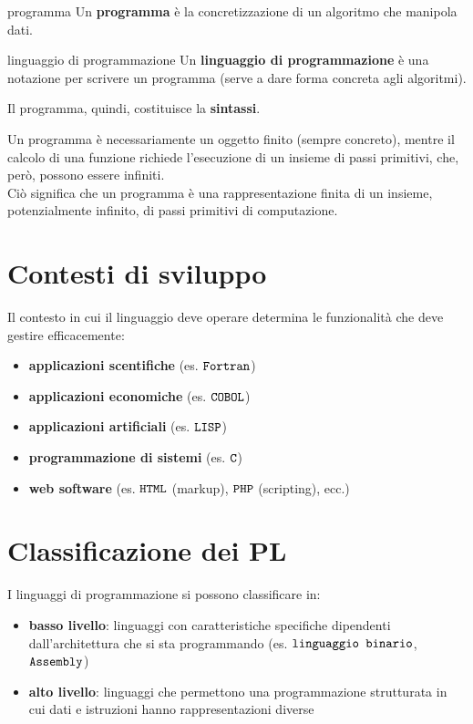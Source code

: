 \begin{mydef}{programma}
    Un \textbf{programma} è la concretizzazione di un algoritmo che manipola dati.
\end{mydef}

\begin{mydef}{linguaggio di programmazione}
    Un \textbf{linguaggio di programmazione} è una notazione per scrivere un programma (serve a dare forma concreta agli algoritmi).
\end{mydef}

Il programma, quindi, costituisce la \textcolor{colore}{\textbf{sintassi}}.

\smallskip
Un programma è necessariamente un oggetto finito (sempre concreto), mentre il calcolo di una funzione richiede l'esecuzione di un insieme di passi primitivi, che, però, possono essere infiniti.\\[0.2ex]
Ciò significa che un programma è una rappresentazione finita di un insieme, potenzialmente infinito, di passi primitivi di computazione.


\section{Contesti di sviluppo}
Il contesto in cui il linguaggio deve operare determina le funzionalità che deve gestire efficacemente:
\begin{itemize}[label=$\triangleright$, itemsep=\smallskipamount]
    \item \textbf{applicazioni scentifiche} (es. $\verb|Fortran|$)
    \item \textbf{applicazioni economiche} (es. $\verb|COBOL|$)
    \item \textbf{applicazioni artificiali} (es. $\verb|LISP|$)
    \item \textbf{programmazione di sistemi} (es. $\verb|C|$)
    \item \textbf{web software} (es. $\verb|HTML|$ (markup), $\verb|PHP|$ (scripting), ecc.)
\end{itemize}

\section{Classificazione dei PL}
I linguaggi di programmazione si possono classificare in:
\begin{itemize}[label=$\diamond$, itemsep=\smallskipamount]
    \item \textcolor{colore}{\textbf{basso livello}}: linguaggi con caratteristiche specifiche dipendenti dall'architettura che si sta programmando (es. $\verb|linguaggio binario|$, $\verb|Assembly|$)
    \item \textcolor{colore}{\textbf{alto livello}}: linguaggi che permettono una programmazione strutturata in cui dati e istruzioni hanno rappresentazioni diverse
\end{itemize}

